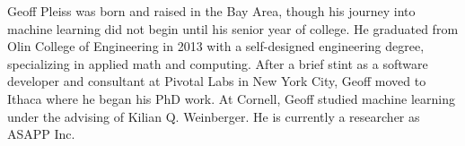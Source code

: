 Geoff Pleiss was born and raised in the Bay Area, though his journey into machine learning did not begin until his senior year of college.
He graduated from Olin College of Engineering in 2013 with a self-designed engineering degree, specializing in applied math and computing.
After a brief stint as a software developer and consultant at Pivotal Labs in New York City, Geoff moved to Ithaca where he began his PhD work.
At Cornell, Geoff studied machine learning under the advising of Kilian Q. Weinberger.
He is currently a researcher as ASAPP Inc.

